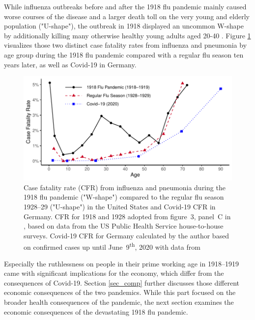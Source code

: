 \documentclass[12pt,a4paper]{article}
\begin{document}
While influenza outbreaks before and after the 1918 flu pandemic mainly caused worse courses of the disease and a larger death toll on the very young and elderly population ("U-shape"),
the outbreak in 1918 displayed an uncommon W-shape by additionally killing many otherwise healthy young adults aged 20-40 \citep{taubenberger1918InfluenzaMother2006}.
Figure \ref{fig_cfr} visualizes those two distinct case fatality rates from influenza and pneumonia by age group during the 1918 flu pandemic compared with a regular flu season ten years later, as well as Covid-19 in Germany.

\begin{figure}[ht]
	\centering
	\includegraphics[]{plots/cfr.pdf}
	\caption[Case Fatality Rate from Influenza and Pneumonia by Age During the 1918 Flu Pandemic Compared to the Regular Flu Season 1928--29 and Covid-19 (2020)]{Case fatality rate (CFR) from influenza and pneumonia during the 1918 flu pandemic ("W-shape") compared to the regular flu season 1928--29 ("U-shape") in the United States and Covid-19 CFR in Germany.
	CFR for 1918 and 1928 adopted from figure~3, panel~C in \cite{taubenberger1918InfluenzaMother2006}, based on data from the US Public Health Service house-to-house surveys.
	Covid-19 CFR for Germany calculated by the author based on confirmed cases up until June~9\textsuperscript{th}, 2020 with data from \cite{robertkochinstituteCovid19CasesJune2020}}
	\label{fig_cfr}
\end{figure}

Especially the ruthlessness on people in their prime working age in 1918--1919 came with significant implications for the economy, which differ from the consequences of Covid-19. Section \ref{sec_comp} further discusses those different economic consequences of the two pandemics.
While this part focused on the broader health consequences of the pandemic, the next section examines the economic consequences of the devastating 1918 flu pandemic.
\end{document}
